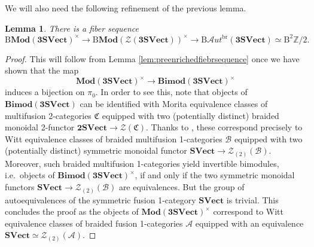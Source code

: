 \documentclass[11pt,reqno]{amsart}
\newcommand{\sAut}{\mathscr{A}ut}
\newcommand{\rB}{\mathrm{B}}
\numberwithin{equation}{section}
\theoremstyle{plain}
\newtheorem{lem}[equation]{Lemma}
\theoremstyle{definition}
\begin{document}
We will also need the following refinement of the previous lemma.

\begin{lem}\label{lem:piBimod}
    There is a fiber sequence
    $$\rB\mathbf{Mod}(\mathbf{3SVect})^{\times}\rightarrow \rB\mathbf{Mod}(\mathcal{Z}(\mathbf{3SVect}))^{\times}\rightarrow\rB\sAut^{\mathrm{br}}(\mathbf{3SVect})\simeq \rB^2\mathbb{Z}/2.$$
\end{lem}
\begin{proof}
This will follow from Lemma \ref{lem:preenrichedfiebrsequence} once we have shown that the map $$\mathbf{Mod}(\mathbf{3SVect})^{\times}\rightarrow \mathbf{Bimod}(\mathbf{3SVect})^{\times}$$ induces a bijection on $\pi_0$.
In order to see this, note that objects of $\mathbf{Bimod}(\mathbf{3SVect})$ can be identified with Morita equivalence classes of multifusion 2-categories $\mathfrak{C}$ equipped with two (potentially distinct) braided monoidal 2-functor $\mathbf{2SVect}\rightarrow \mathcal{Z}(\mathfrak{C})$.
Thanks to \cite{D9}, these correspond precisely to Witt equivalence classes of braided multifusion 1-categories $\mathcal{B}$ equipped with two (potentially distinct) symmetric monoidal functor $\mathbf{SVect}\rightarrow\mathcal{Z}_{(2)}(\mathcal{B})$. Moreover, such braided multifusion 1-categories yield invertible bimodules, i.e.\ objects of $\mathbf{Bimod}(\mathbf{3SVect})^{\times}$, if and only if the two symmetric monoidal functors $\mathbf{SVect}\rightarrow\mathcal{Z}_{(2)}(\mathcal{B})$ are equivalences. But the group of autoequivalences of the symmetric fusion 1-category $\mathbf{SVect}$ is trivial. This concludes the proof as the objects of $\mathbf{Mod}(\mathbf{3SVect})^{\times}$ correspond to Witt equivalence classes of braided fusion 1-categories $\mathcal{A}$ equipped with an equivalence $\mathbf{SVect}\simeq\mathcal{Z}_{(2)}(\mathcal{A})$.
\end{proof}
\end{document}
